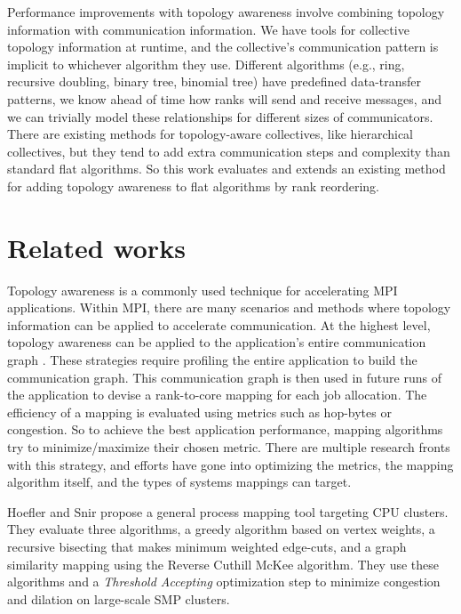 Performance improvements with topology awareness involve combining topology information with communication information.
We have tools for collective topology information at runtime, and the collective's communication pattern is implicit to whichever algorithm they use.  
Different algorithms (e.g., ring, recursive doubling, binary tree, binomial tree) have predefined data-transfer patterns, we know ahead of time how ranks will send and receive messages, and we can trivially model these relationships for different sizes of communicators.
There are existing methods for topology-aware collectives, like hierarchical collectives, but they tend to add extra communication steps and complexity than standard flat algorithms.
So this work evaluates and extends an existing method for adding topology awareness to flat algorithms by rank reordering.

\section{Related works}
Topology awareness is a commonly used technique for accelerating \gls{MPI} applications. 
Within \gls{MPI}, there are many scenarios and methods where topology information can be applied to accelerate communication.
At the highest level, topology awareness can be applied to the application's entire communication graph \cite{Hoefler2011GenericTopoMappingStrats, Mirsadeghi2016PTRAM, Faraji2016TopoAwareGPUSelection, Mirsadeghi2016MAGC, Galvez2017AutoTopoMap}.
These strategies require profiling the entire application to build the communication graph.
This communication graph is then used in future runs of the application to devise a rank-to-core mapping for each job allocation.
The efficiency of a mapping is evaluated using metrics such as hop-bytes or congestion.
So to achieve the best application performance, mapping algorithms try to minimize/maximize their chosen metric.
There are multiple research fronts with this strategy, and efforts have gone into optimizing the metrics, the mapping algorithm itself, and the types of systems mappings can target.

Hoefler and Snir \cite{Hoefler2011GenericTopoMappingStrats} propose a general process mapping tool targeting \gls{CPU} clusters.
They evaluate three algorithms, a greedy algorithm based on vertex weights, a recursive bisecting that makes minimum weighted edge-cuts, and a graph similarity mapping using the Reverse Cuthill McKee algorithm. 
They use these algorithms and a \textit{Threshold Accepting} optimization step to minimize congestion and dilation on large-scale \gls{SMP} clusters.


